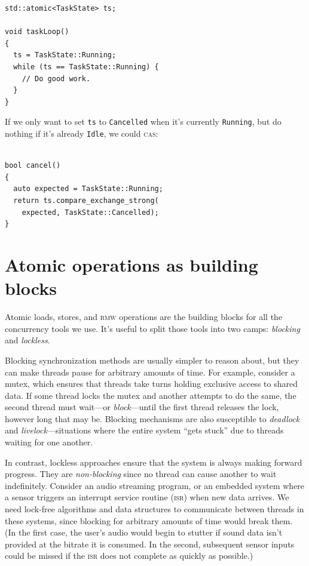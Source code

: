 \documentclass[fontsize=10pt, numbers=endperiod]{scrartcl}
\newcommand{\codesize}{\fontsize{10pt}{12pt}}
\newcommand{\introduce}[1]{\textit{#1}}
\newenvironment{colfigure}
  {\par\vspace{1\baselineskip minus 0.5\baselineskip}\noindent\minipage{\linewidth}}
  {\endminipage\vspace*{1\baselineskip minus 0.7\baselineskip}}
\begin{document}
\begin{multicols}{2}
\begin{colfigure}
\begin{verbatim}
std::atomic<TaskState> ts;

void taskLoop()
{
  ts = TaskState::Running;
  while (ts == TaskState::Running) {
    // Do good work.
  }
}
\end{verbatim}
\end{colfigure}
If we only want to set \texttt{ts} to \texttt{Cancelled} when it's
currently \texttt{Running}, but do nothing if it's already \texttt{Idle},
we could \textsc{cas}:
\begin{colfigure}
\begin{verbatim}

bool cancel()
{
  auto expected = TaskState::Running;
  return ts.compare_exchange_strong(
    expected, TaskState::Cancelled);
}
\end{verbatim}
\end{colfigure}

\section{Atomic operations as building blocks}

Atomic loads, stores, and \textsc{rmw} operations are the building
blocks for all the concurrency tools we use.
It's useful to split those tools into two camps:
\introduce{blocking} and \introduce{lockless}.

Blocking synchronization methods are usually simpler to reason about,
but they can make threads pause for arbitrary amounts of time.
For example, consider a mutex,
which ensures that threads take turns holding exclusive access to shared data.
If some thread locks the mutex
and another attempts to do the same,
the second thread must wait---or \introduce{block}---until
the first thread releases the lock,
however long that may be.
Blocking mechanisms are also susceptible to \introduce{deadlock} and
\introduce{livelock}---situations where the entire system ``gets stuck''
due to threads waiting for one another.

In contrast, lockless approaches
ensure that the system is always making forward progress.
They are \introduce{non-blocking} since no thread can cause another to wait
indefinitely.
Consider an audio streaming program,
or an embedded system where a sensor triggers an interrupt service routine
\textsc{(isr)} when new data arrives.
We need lock-free algorithms and data structures to communicate
between threads in these systems,
since blocking for arbitrary amounts of time would break them.
(In the first case, the user's audio would begin to stutter if sound data
isn't provided at the bitrate it is consumed.
In the second, subsequent sensor inputs could be missed if the \textsc{isr}
does not complete as quickly as possible.)


\end{multicols}
\end{document}
